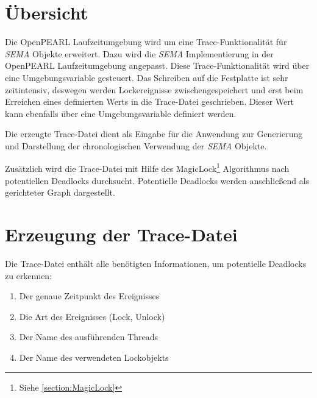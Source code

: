 \section{Übersicht}
\label{section:Übersicht}
Die OpenPEARL Laufzeitumgebung wird um eine Trace-Funktionalität für \emph{SEMA}
Objekte erweitert. Dazu wird die \emph{SEMA} Implementierung in der OpenPEARL
Laufzeitumgebung angepasst. Diese Trace-Funktionalität wird über eine
Umgebungsvariable gesteuert. Das Schreiben auf die Festplatte ist sehr
zeitintensiv, deswegen werden Lockereignisse zwischengespeichert und erst beim
Erreichen eines definierten Werts in die Trace-Datei geschrieben. Dieser Wert
kann ebenfalls über eine Umgebungsvariable definiert werden.

Die erzeugte Trace-Datei dient als Eingabe für die Anwendung zur Generierung und
Darstellung der chronologischen Verwendung der \emph{SEMA} Objekte.

Zusätzlich wird die Trace-Datei mit Hilfe des MagicLock\footnote{Siehe
\cref{section:MagicLock}} Algorithmus nach potentiellen Deadlocks durchsucht.
Potentielle Deadlocks werden anschließend als gerichteter Graph dargestellt.

\section{Erzeugung der Trace-Datei}
\label{section:Erzeugung der Trace-Datei}
Die Trace-Datei enthält alle benötigten Informationen, um potentielle Deadlocks
zu erkennen:
\begin{enumerate}
  \item Der genaue Zeitpunkt des Ereignisses 
  \item Die Art des Ereignisses (Lock, Unlock)
  \item Der Name des ausführenden Threads
  \item Der Name des verwendeten Lockobjekts
\end{enumerate}

